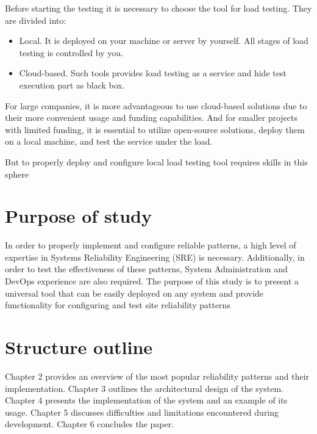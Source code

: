 Before starting the testing it is necessary to choose the tool for load testing. They are divided into:
\begin{itemize}
\item Local. It is deployed on your machine or server by yourself. All stages of load testing is controlled by you.
\item Cloud-based. Such tools provides load testing as a service and hide test execution part as black box.
\end{itemize}

For large companies, it is more advantageous to use cloud-based solutions due to their more convenient usage and funding capabilities.
And for smaller projects with limited funding, it is essential to utilize open-source solutions, deploy them on a local machine, and test the service under the load.

But to properly deploy and configure local load testing tool requires skills in this sphere

\section{Purpose of study}\label{sec:purpose}
In order to properly implement and configure reliable patterns, a high level of expertise in Systems Reliability Engineering (SRE) is necessary. Additionally, in order to test the effectiveness of these patterns, System Administration and DevOps experience are also required.
The purpose of this study is to present a universal tool that can be easily deployed on any system and provide functionality for configuring and test site reliability patterns

\section{Structure outline}\label{sec:structure-outline}
Chapter 2 provides an overview of the most popular reliability patterns and their implementation.
Chapter 3 outlines the architectural design of the system.
Chapter 4 presents the implementation of the system and an example of its usage.
Chapter 5 discusses difficulties and limitations encountered during development.
Chapter 6 concludes the paper.
